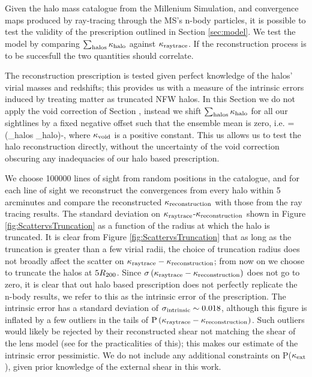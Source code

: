 \documentclass[useAMS,usenatbib]{mn2e}
\begin{document}
Given the halo mass catalogue from the Millenium Simulation, and convergence maps produced by
ray-tracing through the MS's n-body particles, 
it is possible to test the validity of the prescription outlined in Section \ref{sec:model}. We test the model
 by comparing $\sum_{\rm halos} \kappa_{\rm halo}$ against $\kappa_{\rm raytrace}$. If the reconstruction process is to be
 succesfull the two quantities should correlate.

The reconstruction prescription is tested given perfect
knowledge of the halos' virial masses and redshifts; this provides us with a measure of the intrinsic
errors induced by treating matter as truncated NFW halos. In this Section we do not apply the void correction of
Section \label{subsec:voids}, instead we shift $\sum_{\rm halos} \kappa_{\rm halo}$ for all our sightlines by a fixed negative offset such that the ensemble mean
is zero, i.e.
\be \label{eq:totalkappax}
\kapparec = \left(\sum_{\rm halos} \kappa_{\rm halo}\right)-\kappav,
\ee
where $\kappa_{\rm void}$ is a positive constant. This us allows us to test the halo reconstruction directly, without the uncertainty of the void correction
obscuring any inadequacies of our halo based prescription.

We choose 100000 lines of sight from random positions in the catalogue, and for each line of sight we reconstruct the
convergences from every halo within 5 arcminutes and compare the reconstructed
$\kappa_{\rm reconstruction}$ with those from the ray tracing results. The standard deviation on $\kappa_{\rm raytrace}$-$\kappa_{\rm reconstruction}$ 
shown in Figure \ref{fig:ScattervsTruncation} as a function of the radius at which the halo is truncated.
 It is clear from Figure \ref{fig:ScattervsTruncation} 
that as long as the truncation is greater than a few virial radii, the choice of truncation
radius does not broadly affect the scatter on $\kappa_{\rm raytrace}-\kappa_{\rm reconstruction}$; from now on we choose 
to truncate the halos at $5 R_{200}$. Since $\sigma\left(\kappa_{\rm raytrace}-\kappa_{\rm reconstruction}\right)$ does not go to
zero, it is clear that out halo based prescription does not perfectly replicate the n-body results, we refer to this
 as the intrinsic error of the prescription.
 The intrinsic error has a standard deviation of $\sigma_{\rm intrinsic} \sim 0.018$, although
this figure is inflated by a few outliers in the tails of ${\rm P}\left(\kappa_{\rm raytrace}-\kappa_{\rm reconstruction}\right)$. Such outliers would 
likely be rejected by their reconstructed shear not matching the shear of the lens model 
(see \citet{wong} for the practicalities of this);
 this makes our estimate of the intrinsic error pessimistic. We do not include any additional constraints on P($\kappa_{\rm ext}$), given prior knowledge of the external shear in this work.
\end{document}
